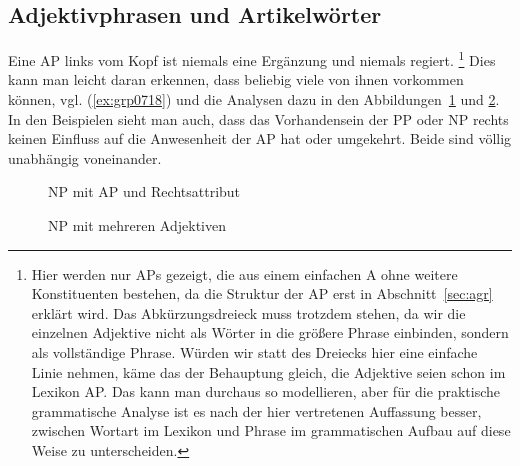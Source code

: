 \subsection{Adjektivphrasen und Artikelwörter}

\label{sec:adjektiveundartikelwoerter}

Eine AP links vom Kopf ist niemals eine Ergänzung und niemals regiert.%
\footnote{Hier werden nur APs gezeigt, die aus einem einfachen A ohne weitere Konstituenten bestehen, da die Struktur der AP erst in Abschnitt~\ref{sec:agr} erklärt wird.
Das Abkürzungsdreieck muss trotzdem stehen, da wir die einzelnen Adjektive nicht als Wörter in die größere Phrase einbinden, sondern als vollständige Phrase.
Würden wir statt des Dreiecks hier eine einfache Linie nehmen, käme das der Behauptung gleich, die Adjektive seien schon im Lexikon AP.
Das kann man durchaus so modellieren, aber für die praktische grammatische Analyse ist es nach der hier vertretenen Auffassung besser, zwischen Wortart im Lexikon und Phrase im grammatischen Aufbau auf diese Weise zu unterscheiden.}
Dies kann man leicht daran erkennen, dass beliebig viele von ihnen vorkommen können, vgl. (\ref{ex:grp0718}) und die Analysen dazu in den Abbildungen~\ref{fig:grp0718a} und \ref{fig:grp0718b}.
In den Beispielen sieht man auch, dass das Vorhandensein der PP oder NP rechts keinen Einfluss auf die Anwesenheit der AP hat oder umgekehrt.
Beide sind völlig unabhängig voneinander.

\begin{exe}
  \ex\label{ex:grp0718}
  \begin{xlist}
  \end{xlist}
\end{exe}

\begin{figure}[!htbp]
  \centering
  \caption{NP mit AP und Rechtsattribut}
  \label{fig:grp0718a}
\end{figure}

\begin{figure}[!htbp]
  \centering
  \caption{NP mit mehreren Adjektiven}
  \label{fig:grp0718b}
\end{figure}

